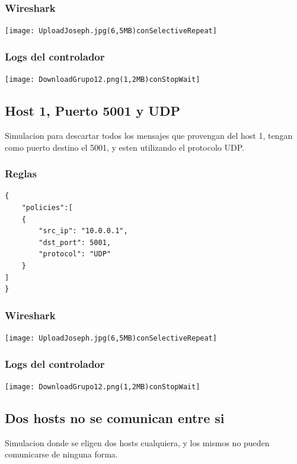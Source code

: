 \documentclass{article}
\begin{document}
\subsubsection{Wireshark}
\begin{center}
\texttt{[image: UploadJoseph.jpg(6,5MB)conSelectiveRepeat]}
\end{center}

\subsubsection{Logs del controlador}
\begin{center}
\texttt{[image: DownloadGrupo12.png(1,2MB)conStopWait]}
\end{center}


\subsection{Host 1, Puerto 5001 y UDP}
Simulacion para descartar todos los mensajes que provengan del host 1, tengan como puerto destino el 5001, y esten utilizando el protocolo UDP.

\subsubsection{Reglas}

\begin{verbatim}
{
    "policies":[
    {
        "src_ip": "10.0.0.1",
        "dst_port": 5001,
        "protocol": "UDP"
    }
]
}
\end{verbatim}

\subsubsection{Wireshark}
\begin{center}
\texttt{[image: UploadJoseph.jpg(6,5MB)conSelectiveRepeat]}
\end{center}

\subsubsection{Logs del controlador}
\begin{center}
\texttt{[image: DownloadGrupo12.png(1,2MB)conStopWait]}
\end{center}

\subsection{Dos hosts no se comunican entre si}
Simulacion donde se eligen dos hosts cualquiera, y los mismos no pueden comunicarse de ninguna forma.
\end{document}
